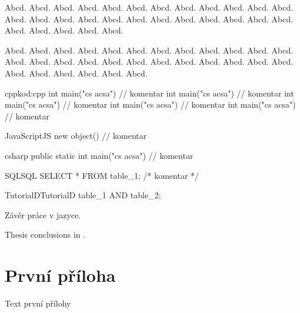 \documentclass[
  program=itp,
  biblatex,
  figures=false,
  glossaries,
  index
]{kidiplom}
\begin{document}
\begin{consequence}
Abcd. Abcd. Abcd. Abcd. Abcd. Abcd. Abcd. Abcd. Abcd. Abcd. Abcd. Abcd. Abcd. Abcd. Abcd. Abcd. Abcd. Abcd. Abcd. Abcd. Abcd. Abcd. Abcd. Abcd. Abcd. Abcd. Abcd. Abcd. Abcd.
\end{consequence}

\begin{theorem}
Abcd. Abcd. Abcd. Abcd. Abcd. Abcd. Abcd. Abcd. Abcd. Abcd. Abcd. Abcd. Abcd. Abcd. Abcd. Abcd. Abcd. Abcd. Abcd. Abcd. Abcd. Abcd. Abcd. Abcd. Abcd. Abcd. Abcd. Abcd. Abcd. Abcd.
\end{theorem}


\begin{kicode}{cpp}{kod:cpp}{\cpp}
int main("cs acsa") // komentar
int main("cs acsa") // komentar
int main("cs acsa") // komentar
int main("cs acsa") // komentar
int main("cs acsa") // komentar
\end{kicode}

\begin{kicode}{JavaScript}{}{JS}
new object() // komentar
\end{kicode}

\begin{kicode}{csharp}{}{\csharp}
public static int main("cs acsa") // komentar
\end{kicode}

\begin{kicode}{SQL}{}{SQL}
SELECT * FROM table_1; /* komentar */
\end{kicode}

\begin{kicode}{TutorialD}{}{TutorialD}
table_1 AND table_2;
\end{kicode}

\begin{kiconclusions}
Závěr práce v  jazyce.
\end{kiconclusions}

\begin{kiconclusions}[english]
Thesis conclusions in .
\end{kiconclusions}

\appendix

\section{První příloha}
Text první přílohy
\end{document}
